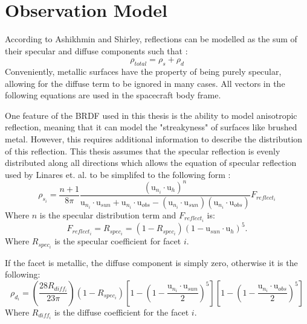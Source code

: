 
\section*{Observation Model}

According to Ashikhmin and Shirley, reflections can be modelled as the sum of their specular and diffuse components such that \cite{phong_brdf}:
\begin{equation}
\rho_{total} = \rho_s + \rho_d
\end{equation}
Conveniently, metallic surfaces have the property of being purely specular, allowing for the diffuse term to be ignored in many cases\cite{phong_brdf}. All vectors in the following equations are used in the spacecraft body frame.

One feature of the BRDF used in this thesis is the ability to model anisotropic reflection, meaning that it can model the "streakyness" of surfaces like brushed metal. However, this requires additional information to describe the distribution of this reflection. This thesis assumes that the specular reflection is evenly distributed along all directions which allows the equation of specular reflection used by Linares et. al. to be simplifed to the following form \cite{Linares_data_fusion}:
\begin{equation}
\rho_{s_i} = \frac{n + 1}{8\pi}
\frac{(\bm{\mathrm{u}}_{n_i}\cdotp \bm{\mathrm{u}}_h)^n}
{\bm{\mathrm{u}}_{n_i}\cdotp \bm{\mathrm{u}}_{sun} + \bm{\mathrm{u}}_{n_i}\cdotp \bm{\mathrm{u}}_{obs} - (\bm{\mathrm{u}}_{n_i}\cdotp \bm{\mathrm{u}}_{sun})(\bm{\mathrm{u}}_{n_i}\cdotp \bm{\mathrm{u}}_{obs})}F_{reflect_i}
\end{equation}
Where $n$ is the specular distribution term and $F_{reflect_i}$ is:
\begin{equation}
F_{reflect_i} = R_{spec_i} = (1 - R_{spec_i})(1 - \bm{\mathrm{u}}_{sun}\cdotp \bm{\mathrm{u}}_h)^5.
\end{equation}
Where $R_{spec_i}$ is the specular coefficient for facet $i$.

If the facet is metallic, the diffuse component is simply zero, otherwise it is the following:
\begin{equation}
\rho_{d_i} = \left(\frac{28R_{diff_i}}{23\pi}\right)
(1 - R_{spec_i})
\left[1 - (1 - \frac{\bm{\mathrm{u}}_{n_i}\cdotp \bm{\mathrm{u}}_{sun}}{2})^5\right]
\left[1 - (1 - \frac{\bm{\mathrm{u}}_{n_i}\cdotp \bm{\mathrm{u}}_{obs}}{2})^5\right]
\end{equation}
Where $R_{diff_i}$ is the diffuse coefficient for the facet $i$.

